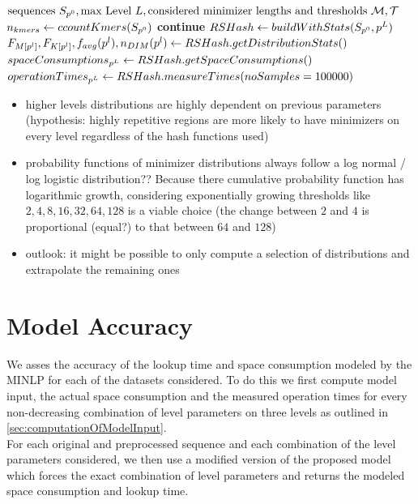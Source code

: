 \documentclass[a4paper,titlepage,onecolumn,oneside,12pt,nenglish,titlepage=firstiscover]{scrbook}
\theoremstyle{plain} %
\theoremstyle{definition} %
\theoremstyle{remark} %
\theoremstyle{plain}
\newcommand{\level}{l}
\newcommand{\averageFrequency}{f_{avg}}
\newcommand{\possibleMinimizerLengths}{\mathcal{M}}
\newcommand{\possibleThresholds}{\mathcal{T}}
\begin{document}
\begin{algorithm} 
	\caption{Computation of Minimizer Distribution} \label{algo:computeMinDistr}
	\begin{algorithmic} 
		\Input $
		\text{sequences } \sequences{0},
		\text{max Level } \numberOfLevels,
		\text{considered minimizer lengths and thresholds } \possibleMinimizerLengths, \possibleThresholds
		$
		\Function{statsComputation}{$\sequences{0}, \numberOfLevels, \possibleMinimizerLengths, \possibleThresholds$}
		\State $n_{kmers} \gets ccountKmers(S_{p^{0}})$
		\For{$\levelParameters{L} \in \possibleMinimizerLengths^L \times \possibleThresholds^L$}
		 \State \textbf{continue} \EndIf
		\State $RSHash \gets buildWithStats(S_{p^{0}}, p^{L})$
		\State $\CDF{\compactZV{M}{\levelParameters{\level}}},
		\CDF{\compactZV{K}{\levelParameters{\level}}},
		\averageFrequency(\levelParameters{\level}), \numberOfDistinctMinimizers{\levelParameters{\level}} \gets RSHash.getDistributionStats()$
		\State $spaceConsumptions_{p^{L}} \gets RSHash.getSpaceConsumptions()$
		\State $operationTimes_{p^{L}} \gets RSHash.measureTimes(noSamples=100000)$
		\EndFor
		\EndFunction
	\end{algorithmic}
\end{algorithm}

\begin{itemize}
	\item higher levels distributions are highly dependent on previous parameters (hypothesis: highly repetitive regions are more likely to have \infrequent minimizers on every level regardless of the hash functions used)
	\item probability functions of minimizer distributions always follow a log normal / log logistic distribution?? Because there cumulative probability function has logarithmic growth, considering exponentially growing thresholds like $2,4,8,16,32,64,128$ is a viable choice (the change between $2$ and $4$ is proportional (equal?) to that between $64$ and $128$)
	\item outlook: it might be possible to only compute a selection of distributions and extrapolate the remaining ones
\end{itemize}

\section{Model Accuracy}
We asses the accuracy of the lookup time and space consumption modeled by the MINLP for each of the datasets considered. To do this we first compute model input, the actual space consumption and the measured operation times for every non-decreasing combination of level parameters on three levels as outlined in \cref{sec:computationOfModelInput}.\\
For each original and preprocessed sequence and each combination of the level parameters considered, we then use a modified version of the proposed model which forces the exact combination of level parameters and returns the modeled space consumption and lookup time.
\end{document}

